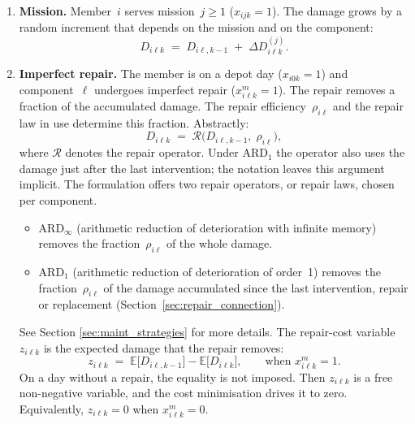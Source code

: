 \documentclass[11pt,a4paper]{article}
\theoremstyle{plain}
\theoremstyle{definition}
\theoremstyle{remark}
\begin{document}
\begin{enumerate}[label=(\roman*)]
  \item \textbf{Mission.} Member~$i$ serves mission~$j \ge 1$ ($x_{ijk}=1$).
    The damage grows by a random increment that depends on the mission and on the component:
    \begin{equation}\label{eq:dyn_mission}
      D_{i\ell k} \;=\; D_{i\ell,k-1} \;+\; \Delta D_{i\ell k}^{(j)}.
    \end{equation}

  \item \textbf{Imperfect repair.} The member is on a depot day ($x_{i0k}=1$) and component~$\ell$ undergoes imperfect repair ($x^m_{i\ell k}=1$).
    The repair removes a fraction of the accumulated damage.
    The repair efficiency~$\rho_{i\ell}$ and the repair law in use determine this fraction.
    Abstractly:
    \begin{equation}\label{eq:dyn_repair}
      D_{i\ell k} \;=\; \mathcal{R}\!\bigl(D_{i\ell,k-1},\;\rho_{i\ell}\bigr),
    \end{equation}
    where $\mathcal{R}$ denotes the repair operator.
    Under $\text{ARD}_1$ the operator also uses the damage just after the last intervention; the notation leaves this argument implicit.
    The formulation offers two repair operators, or repair laws, chosen per component.
    \begin{itemize}
      \item $\text{ARD}_\infty$ (arithmetic reduction of deterioration with infinite memory) removes the fraction~$\rho_{i\ell}$ of the whole damage.
      \item $\text{ARD}_1$ (arithmetic reduction of deterioration of order~1) removes the fraction~$\rho_{i\ell}$ of the damage accumulated since the last intervention, repair or replacement (Section~\ref{sec:repair_connection}).
    \end{itemize}
    See Section \ref{sec:maint_strategies} for more details.
    The repair-cost variable $z_{i\ell k}$ is the expected damage that the repair removes:
    \begin{equation}\label{eq:z_def}
      z_{i\ell k} \;=\; \mathbb{E}\bigl[D_{i\ell,k-1}\bigr] - \mathbb{E}\bigl[D_{i\ell k}\bigr],
      \qquad \text{when } x^m_{i\ell k}=1.
    \end{equation}
    On a day without a repair, the equality is not imposed.
    Then $z_{i\ell k}$ is a free non-negative variable, and the cost minimisation drives it to zero.
    Equivalently, $z_{i\ell k} = 0$ when $x^m_{i\ell k} = 0$.


\end{enumerate}
\end{document}
